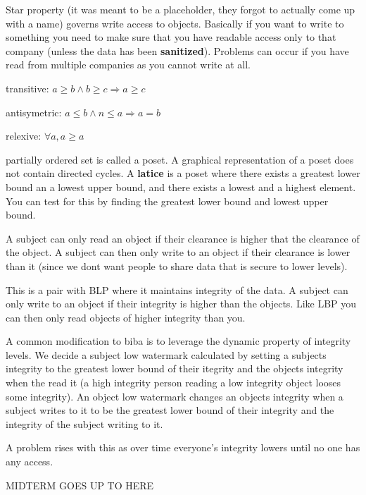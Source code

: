 \documentclass{article}
\begin{document}
Star property (it was meant to be a placeholder, they forgot to actually come up with a name) governs write access to objects. Basically if you want to write to something you need to make sure that you have readable access only to that company (unless the data has been \textbf{sanitized}). Problems can occur if you have read from multiple companies as you cannot write at all.




transitive: 	$a \ge b \wedge b \ge c \Rightarrow a \ge c$

antisymetric: 	$a \le b \wedge n \le a \Rightarrow a = b$

relexive: 		$\forall a, a \ge a$

partially ordered set is called a poset. A graphical representation of a poset does not contain directed cycles. A \textbf{latice} is a poset where there exists a greatest lower bound an a lowest upper bound, and there exists a lowest and a highest element. You can test for this by finding the greatest lower bound and lowest upper bound. 



A subject can only read an object if their clearance is higher that the clearance of the object. A subject can then only write to an object if their clearance is lower than it (since we dont want people to share data that is secure to lower levels).


This is a pair with BLP where it maintains integrity of the data. A subject can only write to an object if their integrity is higher than the objects. Like LBP you can then only read objects of higher integrity than you.


A common modification to biba is to leverage the dynamic property of integrity levels. We decide a subject low watermark calculated by setting a subjects integrity to the greatest lower bound of their itegrity and the objects integrity when the read it (a high integrity person reading a low integrity object looses some integrity). An object low watermark changes an objects integrity when a subject writes to it to be the greatest lower bound of their integrity and the integrity of the subject writing to it.

A problem rises with this as over time everyone's integrity lowers until no one has any access.






MIDTERM GOES UP TO HERE
\end{document}
